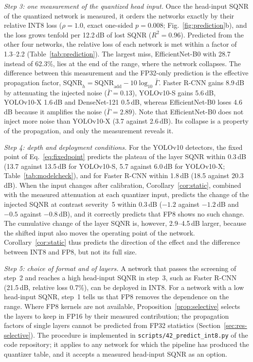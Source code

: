 \documentclass[pdflatex,sn-mathphys-num]{sn-jnl}%
\theoremstyle{thmstyleone}%
\theoremstyle{thmstyletwo}%
\theoremstyle{thmstylethree}%
\begin{document}
\emph{Step 3: one measurement of the quantized head input.} Once the head-input SQNR of the quantized network is measured, it orders the networks exactly by their relative INT8 loss ($\rho=1.0$, exact one-sided $p=0.008$; Fig.~\ref{fig:prediction}b), and the loss grows tenfold per 12.2\,dB of lost SQNR ($R^2=0.96$). Predicted from the other four networks, the relative loss of each network is met within a factor of 1.3--2.2 (Table~\ref{tab:prediction}). The largest miss, EfficientNet-B0 with 28.7 instead of 62.3\%, lies at the end of the range, where the network collapses. The difference between this measurement and the FP32-only prediction is the effective propagation factor, $\mathrm{SQNR}_h=\mathrm{SQNR}_\text{add}-10\log_{10}\bar\Gamma$. Faster R-CNN gains 8.9\,dB by attenuating the injected noise ($\bar\Gamma=0.13$), YOLOv10-S gains 5.6\,dB, YOLOv10-X 1.6\,dB and DenseNet-121 0.5\,dB, whereas EfficientNet-B0 loses 4.6\,dB because it amplifies the noise ($\bar\Gamma=2.89$). Note that EfficientNet-B0 does not inject more noise than YOLOv10-X (3.7 against 2.6\,dB). Its collapse is a property of the propagation, and only the measurement reveals it.

\emph{Step 4: depth and deployment conditions.} For the YOLOv10 detectors, the fixed point of Eq.~\eqref{eq:fixedpoint} predicts the plateau of the layer SQNR within 0.3\,dB (13.7 against 13.5\,dB for YOLOv10-S, 5.7 against 6.0\,dB for YOLOv10-X; Table~\ref{tab:modelcheck}), and for Faster R-CNN within 1.8\,dB (18.5 against 20.3\,dB). When the input changes after calibration, Corollary~\ref{cor:static}, combined with the measured attenuation at each quantizer input, predicts the change of the injected SQNR at contrast severity~5 within 0.3\,dB ($-1.2$ against $-1.2$\,dB and $-0.5$ against $-0.8$\,dB), and it correctly predicts that FP8 shows no such change. The cumulative change of the layer SQNR is, however, 2.9--4.5\,dB larger, because the shifted input also moves the operating point of the network. Corollary~\ref{cor:static} thus predicts the direction of the effect and the difference between INT8 and FP8, but not its full size.

\emph{Step 5: choice of format and of layers.} A network that passes the screening of step~2 and reaches a high head-input SQNR in step~3, such as Faster R-CNN (21.5\,dB, relative loss 0.7\%), can be deployed in INT8. For a network with a low head-input SQNR, step~1 tells us that FP8 removes the dependence on the range. Where FP8 kernels are not available, Proposition~\ref{prop:selective} selects the layers to keep in FP16 by their measured contribution; the propagation factors of single layers cannot be predicted from FP32 statistics (Section~\ref{sec:res-selective}). The procedure is implemented in \texttt{scripts/42\_predict\_int8.py} of the code repository; it applies to any network for which the pipeline has produced the quantizer table, and it accepts a measured head-input SQNR as an option.
\end{document}
